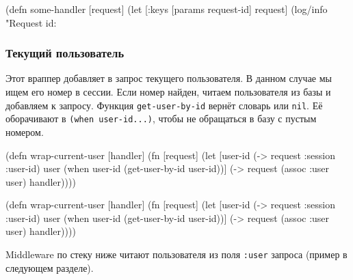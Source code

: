 \else

\begin{english}
  \begin{clojure}
(defn some-handler [request]
  (let [{:keys [params request-id]} request]
    (log/info "Request id: %
  \end{clojure}
\end{english}

\fi

\subsubsection*{Текущий пользователь}


Этот враппер добавляет в запрос текущего пользователя. В данном случае мы ищем
его номер в сессии. Если номер найден, читаем пользователя из базы и добавляем к
запросу. Функция \verb|get-user-by-id| вернёт словарь или
\verb|nil|. Её оборачивают в \verb|(when user-id...)|, чтобы не
обращаться в базу с пустым номером.


\ifx\DEVICETYPE\MOBILE

\begin{english}
  \begin{clojure}
(defn wrap-current-user [handler]
  (fn [request]
    (let [user-id (-> request
                      :session
                      :user-id)
          user (when user-id
                 (get-user-by-id
                   user-id))]
      (-> request
          (assoc :user user)
          handler))))
  \end{clojure}
\end{english}

\else

\begin{english}
  \begin{clojure}
(defn wrap-current-user [handler]
  (fn [request]
    (let [user-id (-> request :session :user-id)
          user (when user-id
                 (get-user-by-id user-id))]
      (-> request
          (assoc :user user)
          handler))))
  \end{clojure}
\end{english}

\fi


Middleware по стеку ниже читают пользователя из поля \verb|:user| запроса
(пример в следующем разделе).

